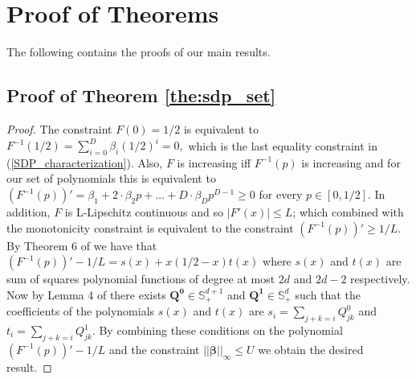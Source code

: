 \documentclass[twoside,11pt]{article}
\begin{document}
\newpage
\appendix
\section{Proof of Theorems}
The following contains the proofs of our main results.
\subsection{Proof of Theorem \ref{the:sdp_set}}
\label{sec:proof_sdp_set}

\begin{proof} The constraint $F(0) = 1/2$ is equivalent to $F^{-1}(1/2) = \sum_{i = 0}^D \beta_i\left(1/2\right)^i = 0,$
which is  the last equality constraint in (\ref{SDP_characterization}). Also, $F$ is increasing iff $F^{-1}(p)$ is increasing and  for our set of polynomials this is equivalent to $(F^{-1}(p))' = \beta_1+2\cdot \beta_2p + ...+D\cdot \beta_D p^{D-1}\geq 0$ for every $p \in [0,1/2]$. In addition, $F$ is L-Lipschitz continuous and so  $|F'(x)| \leq L$; which combined with the monotonicity constraint is equivalent to the constraint $(F^{-1}(p))' \geq 1/L$. By Theorem 6 of \citep{parrilo} we have that $(F^{-1}(p))' - 1/L = s(x) + x(1/2-x)t(x)$ where $s(x)$ and $t(x)$ are sum of squares polynomial functions of degree at most $2d$ and $2d-2$ respectively. Now by Lemma 4 of \citet{parrilo} there exists $\boldsymbol{Q^0}\in \mathbb{S}_+^{d+1}$ and $\boldsymbol{Q^1}\in \mathbb{S}_+^{d}$ such that the coefficients of the polynomials $s(x)$ and $t(x)$ are $s_i = \sum_{j+k=i}Q^0_{jk}$ and $t_i = \sum_{j+k=i}Q^1_{jk}$. By combining these conditions on the polynomial $(F^{-1}(p))' - 1/L$ and the constraint $||\boldsymbol{\beta}||_{\infty} \leq U$ we obtain the desired result.
 \end{proof}
 
\end{document}
